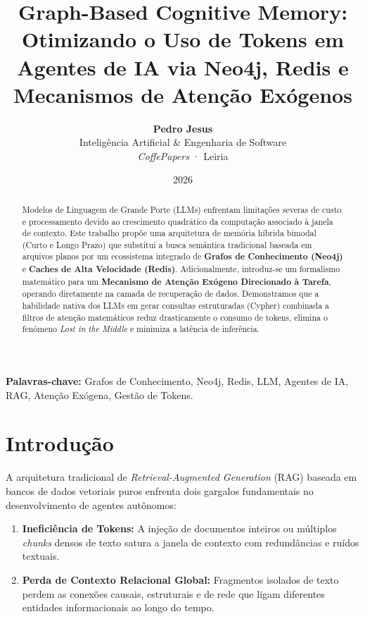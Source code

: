 \documentclass[11pt,a4paper]{article}
\title{Graph-Based Cognitive Memory: Otimizando o Uso de Tokens em Agentes
de IA via Neo4j, Redis e Mecanismos de Atenção Exógenos}
\author{%
  \textbf{Pedro Jesus}\\
  \small Inteligência Artificial \& Engenharia de Software\\
  \small \textit{CoffePapers} · Leiria
}
\date{2026}
\begin{document}
\maketitle

\begin{abstract}
Modelos de Linguagem de Grande Porte (LLMs) enfrentam limitações severas de custo e processamento
devido ao crescimento quadrático da computação associado à janela de contexto. Este trabalho
propõe uma arquitetura de memória híbrida bimodal (Curto e Longo Prazo) que substitui a busca
semântica tradicional baseada em arquivos planos por um ecossistema integrado de
\textbf{Grafos de Conhecimento (Neo4j)} e \textbf{Caches de Alta Velocidade (Redis)}.
Adicionalmente, introduz-se um formalismo matemático para um \textbf{Mecanismo de Atenção
Exógeno Direcionado à Tarefa}, operando diretamente na camada de recuperação de dados.
Demonstramos que a habilidade nativa dos LLMs em gerar consultas estruturadas (Cypher) combinada
a filtros de atenção matemáticos reduz drasticamente o consumo de tokens, elimina o fenômeno
\textit{Lost in the Middle} e minimiza a latência de inferência.
\end{abstract}

{\small\textbf{Palavras-chave:} Grafos de Conhecimento, Neo4j, Redis, LLM, Agentes de IA, RAG,
Atenção Exógena, Gestão de Tokens.}

\tableofcontents
\newpage


\section{Introdução}

A arquitetura tradicional de \textit{Retrieval-Augmented Generation} (RAG) baseada em bancos de
dados vetoriais puros enfrenta dois gargalos fundamentais no desenvolvimento de agentes
autônomos:
\begin{enumerate}
    \item \textbf{Ineficiência de Tokens:} A injeção de documentos inteiros ou múltiplos
          \textit{chunks} densos de texto satura a janela de contexto com redundâncias e ruídos
          textuais.
    \item \textbf{Perda de Contexto Relacional Global:} Fragmentos isolados de texto perdem as
          conexões causais, estruturais e de rede que ligam diferentes entidades informacionais
          ao longo do tempo.
\end{enumerate}
\end{document}
